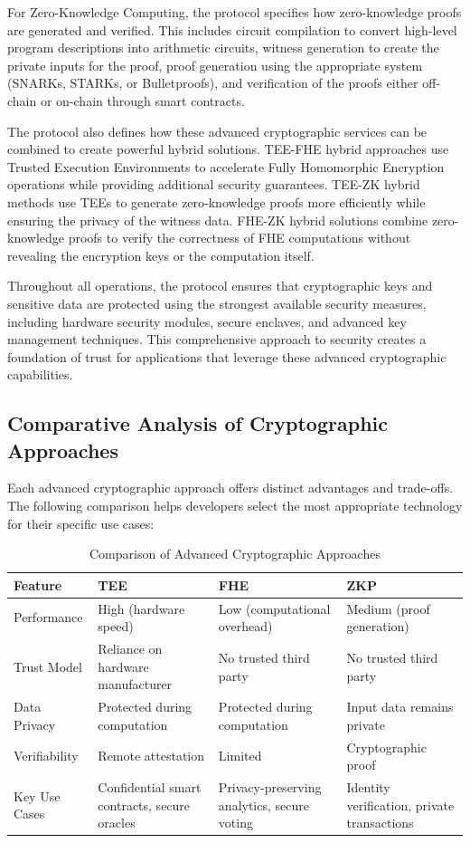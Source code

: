 \documentclass[11pt]{article}
\begin{document}
For Zero-Knowledge Computing, the protocol specifies how zero-knowledge proofs are generated and verified. This includes circuit compilation to convert high-level program descriptions into arithmetic circuits, witness generation to create the private inputs for the proof, proof generation using the appropriate system (SNARKs, STARKs, or Bulletproofs), and verification of the proofs either off-chain or on-chain through smart contracts.

The protocol also defines how these advanced cryptographic services can be combined to create powerful hybrid solutions. TEE-FHE hybrid approaches use Trusted Execution Environments to accelerate Fully Homomorphic Encryption operations while providing additional security guarantees. TEE-ZK hybrid methods use TEEs to generate zero-knowledge proofs more efficiently while ensuring the privacy of the witness data. FHE-ZK hybrid solutions combine zero-knowledge proofs to verify the correctness of FHE computations without revealing the encryption keys or the computation itself.

Throughout all operations, the protocol ensures that cryptographic keys and sensitive data are protected using the strongest available security measures, including hardware security modules, secure enclaves, and advanced key management techniques. This comprehensive approach to security creates a foundation of trust for applications that leverage these advanced cryptographic capabilities.

\subsection{Comparative Analysis of Cryptographic Approaches}

Each advanced cryptographic approach offers distinct advantages and trade-offs. The following comparison helps developers select the most appropriate technology for their specific use cases:

\begin{table}[h]
\centering
\begin{tabular}{|p{2.5cm}|p{3.5cm}|p{3.5cm}|p{3.5cm}|}
\hline
\textbf{Feature} & \textbf{TEE} & \textbf{FHE} & \textbf{ZKP} \\
\hline
Performance & High (hardware speed) & Low (computational overhead) & Medium (proof generation) \\
\hline
Trust Model & Reliance on hardware manufacturer & No trusted third party & No trusted third party \\
\hline
Data Privacy & Protected during computation & Protected during computation & Input data remains private \\
\hline
Verifiability & Remote attestation & Limited & Cryptographic proof \\
\hline
Key Use Cases & Confidential smart contracts, secure oracles & Privacy-preserving analytics, secure voting & Identity verification, private transactions \\
\hline
\end{tabular}
\caption{Comparison of Advanced Cryptographic Approaches}
\label{tab:crypto-comparison}
\end{table}
\end{document}
